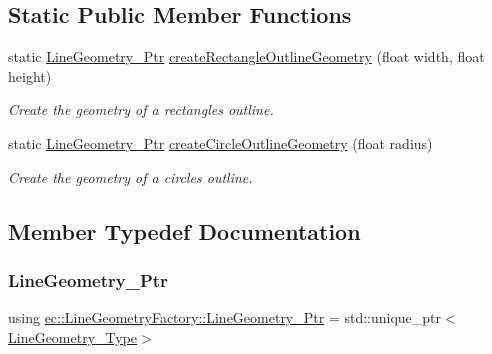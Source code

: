 \subsection*{Static Public Member Functions}
\begin{DoxyCompactItemize}
\item 
static \mbox{\hyperlink{classec_1_1_line_geometry_factory_a8f7bd7480ebc0dbc77930d81dcb69678}{Line\+Geometry\+\_\+\+Ptr}} \mbox{\hyperlink{classec_1_1_line_geometry_factory_ad5a4cbba96cb7d6fa979e6266c7a8912}{create\+Rectangle\+Outline\+Geometry}} (float width, float height)
\begin{DoxyCompactList}\small\item\em Create the geometry of a rectangle\textquotesingle{}s outline. \end{DoxyCompactList}\item 
static \mbox{\hyperlink{classec_1_1_line_geometry_factory_a8f7bd7480ebc0dbc77930d81dcb69678}{Line\+Geometry\+\_\+\+Ptr}} \mbox{\hyperlink{classec_1_1_line_geometry_factory_a7546d1c1b7125a621f2e8a652035e843}{create\+Circle\+Outline\+Geometry}} (float radius)
\begin{DoxyCompactList}\small\item\em Create the geometry of a circle\textquotesingle{}s outline. \end{DoxyCompactList}\end{DoxyCompactItemize}


\subsection{Member Typedef Documentation}
\mbox{\label{classec_1_1_line_geometry_factory_a8f7bd7480ebc0dbc77930d81dcb69678}} 
\subsubsection{\texorpdfstring{Line\+Geometry\+\_\+\+Ptr}{LineGeometry\_Ptr}}
{\footnotesize\ttfamily using \mbox{\hyperlink{classec_1_1_line_geometry_factory_a8f7bd7480ebc0dbc77930d81dcb69678}{ec\+::\+Line\+Geometry\+Factory\+::\+Line\+Geometry\+\_\+\+Ptr}} =  std\+::unique\+\_\+ptr$<$\mbox{\hyperlink{classec_1_1_line_geometry_factory_a3025abbbb9ff132e43d46b17f1381213}{Line\+Geometry\+\_\+\+Type}}$>$}

